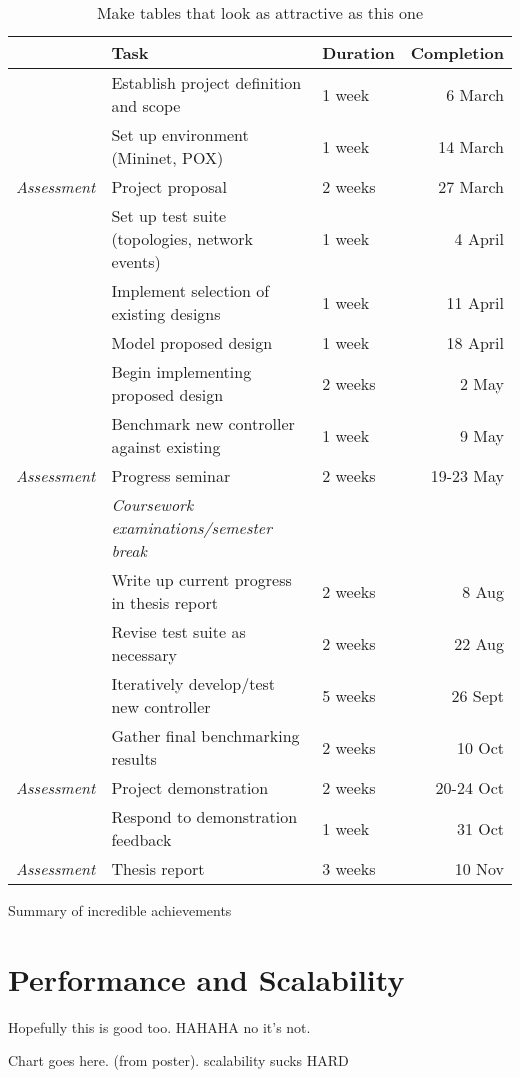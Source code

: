 \begin{table}[H]
  \begin{center}
    \begin{tabular}{@{}rllr@{}}
      \toprule
      & Task & Duration & Completion\\
      \midrule
      & Establish project definition and scope & 1 week & 6 March \\
      & Set up environment (Mininet,  POX) & 1 week & 14 March \\
      \emph{Assessment} & Project proposal & 2 weeks & 27 March \\
      & Set up test suite (topologies, network events) & 1 week & 4 April \\
      & Implement selection of existing designs & 1 week & 11 April \\
      & Model proposed design & 1 week & 18 April \\
      & Begin implementing proposed design & 2 weeks & 2 May \\
      & Benchmark new controller against existing & 1 week & 9 May \\
      \emph{Assessment} & Progress seminar & 2 weeks & 19-23 May \\
      \addlinespace
      & \emph{Coursework examinations/semester break} \\
      \addlinespace
      & Write up current progress in thesis report & 2 weeks & 8 Aug\\
      & Revise test suite as necessary & 2 weeks & 22 Aug\\
      & Iteratively develop/test new controller & 5 weeks & 26 Sept\\
      & Gather final benchmarking results & 2 weeks & 10 Oct \\
      \emph{Assessment} & Project demonstration & 2 weeks & 20-24 Oct \\
      & Respond to demonstration feedback & 1 week & 31 Oct \\
      \emph{Assessment} & Thesis report & 3 weeks & 10 Nov \\
      \bottomrule
    \end{tabular}
    \caption{Make tables that look as attractive as this one}
    \label{table:schedule}
  \end{center}
\end{table}

\begin{table}
\caption{Summary of incredible achievements}
\end{table}

\section{Performance and Scalability}
Hopefully this is good too. HAHAHA no it's not.

Chart goes here. (from poster). scalability sucks HARD

